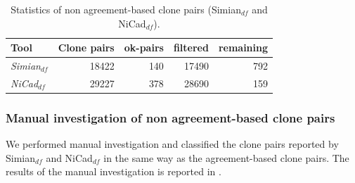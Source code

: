 \documentclass{sig-alternate-05-2015}
\begin{document}
\begin{table}
	\centering
	\caption{Statistics of non agreement-based clone pairs (Simian$_{df}$ and NiCad$_{df}$).}
	\label{tab:classification_indv_stats}
	\small
	\begin{tabular}{l|r|r|r|r}
		\hline 
		Tool & Clone pairs & ok-pairs & filtered & remaining \\ 
		\hline
		\multirow{1}{*}{\textit{Simian$_{df}$}} & 18422 & 140 & 17490 & 792 \\
		\hline
		\multirow{1}{*}{\textit{NiCad$_{df}$}} & 29227  & 378 & 28690 & 159 \\
		\hline
	\end{tabular} 
\end{table}

\subsubsection{Manual investigation of non agreement-based clone pairs}
We performed manual investigation and classified the clone pairs reported by Simian$_{df}$ and NiCad$_{df}$ in the same way as the agreement-based clone pairs. The results of the manual investigation is reported in .
\end{document}
